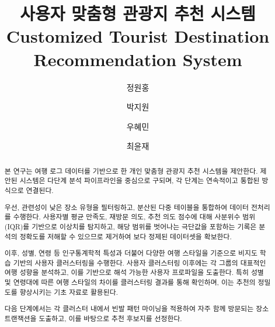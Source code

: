 \documentclass[sigconf]{acmart}
\begin{document}
\begin{CJK}{UTF8}{mj}


\renewcommand\footnotetextcopyrightpermission[1]{} 
\acmISBN{}
\acmDOI{}

\title{사용자 맞춤형 관광지 추천 시스템\\[0.5em]
Customized Tourist Destination Recommendation System}

\author{정원홍}

\author{박지원}

\author{우혜민}

\author{최윤재}


\begin{abstract}

본 연구는 여행 로그 데이터를 기반으로 한 개인 맞춤형 관광지 추천 시스템을 제안한다. 제안된 시스템은 다단계 분석 파이프라인을 중심으로 구되며, 각 단계는 연속적이고 통합된 방식으로 연결된다.

우선, 관련성이 낮은 장소 유형을 필터링하고, 분산된 다중 테이블을 통합하여 데이터 전처리를 수행한다. 사용자별 평균 만족도, 재방문 의도, 추천 의도 점수에 대해 사분위수 범위(IQR)를 기반으로 이상치를 탐지하고, 해당 범위를 벗어나는 극단값을 포함하는 기록은 분석의 정확도를 저해할 수 있으므로 제거하여 보다 정제된 데이터셋을 확보한다.

이후, 성별, 연령 등 인구통계학적 특성과 더불어 다양한 여행 스타일을 기준으로 비지도 학습 기반의 사용자 클러스터링을 수행한다. 사용자 클러스터링 이후에는 각 그룹의 대표적인 여행 성향을 분석하고, 이를 기반으로 해석 가능한 사용자 프로파일을 도출한다. 특히 성별 및 연령대에 따른 여행 스타일의 차이를 클러스터링 결과를 통해 확인하며, 이는 추천의 정밀도를 향상시키는 기초 자료로 활용된다.

다음 단계에서는 각 클러스터 내에서 빈발 패턴 마이닝을 적용하여 자주 함께 방문되는 장소 트랜잭션을 도출하고, 이를 바탕으로 추천 후보지를 선정한다. 


\end{abstract}
\end{CJK}
\end{document}
